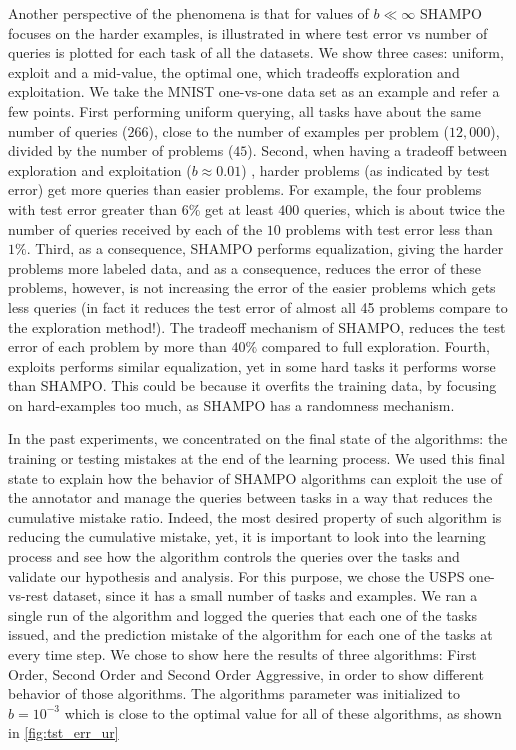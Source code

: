Another perspective of the phenomena is that for values of $b\ll \infty$ SHAMPO focuses on the harder 
examples, is illustrated in  where test error vs number of queries is plotted for each 
task of all the datasets. We show three cases: uniform, exploit and a mid-value, the optimal one, which 
tradeoffs exploration and exploitation. We take the MNIST one-vs-one data set as an example and 
refer a few points. First performing uniform querying, all 
tasks have about the same number of queries ($266$), close to the number of examples per problem 
($12,000$), divided by the number of problems ($45$). Second, when having a tradeoff between exploration 
and exploitation ($b\approx 0.01$) , harder problems (as indicated by test error) get more queries than easier problems. 
For example, the four problems with test error greater than $6\%$ get at least $400$ queries, which is 
about twice the number of queries received by each of the $10$ problems with test error less than $1\%$. 
Third, as a consequence, SHAMPO performs equalization, giving the harder problems more labeled data, 
and as a consequence, reduces the error of these problems, however, is not increasing the error of the 
easier problems which gets less queries (in fact it reduces the test error of almost all 45 problems compare 
to the exploration method!). 
The tradeoff mechanism of SHAMPO, reduces the test error of each problem by more than $40\%$ 
compared to full exploration. Fourth, exploits performs similar equalization, yet in some hard tasks it 
performs worse than SHAMPO. This could be because it overfits the training data, by focusing on 
hard-examples too much, as SHAMPO has a randomness mechanism.

In the past experiments, we concentrated on the final state of the algorithms: 
the training or testing mistakes at the end of the learning process. We used 
this final state to explain how the behavior of SHAMPO algorithms can exploit the use of the annotator and 
manage the queries between tasks in a way that reduces the cumulative mistake ratio. Indeed, the most desired 
property of such algorithm is reducing the cumulative mistake, yet, it is important to
look into the learning process and see how the algorithm controls the queries 
over the tasks and validate our hypothesis and analysis. For this purpose, we chose the USPS one-vs-rest dataset, since it has a small number of 
tasks and examples. We ran a single run of the algorithm and logged the 
queries that each one of the tasks issued, and the prediction mistake of the 
algorithm for each one of the tasks at every time step. We chose to show here the 
results of three algorithms: First Order, Second Order and Second Order Aggressive, in order to show 
different behavior of those algorithms. The algorithms parameter was initialized to $b=10^{-3}$ 
which is close to the optimal value for all of these algorithms, as shown in \eqref{fig:tst_err_ur}

